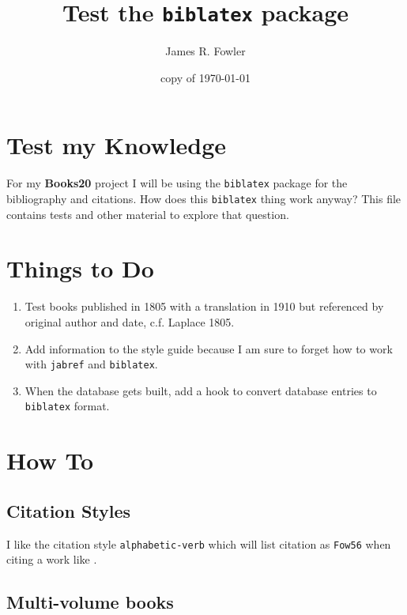 \documentclass{article}
\begin{document}
\title{Test the {\tt biblatex} package}
\author{James R. Fowler}
\date{copy of \today}
\maketitle


\section{Test my Knowledge}

For my {\bf Books20} project I will be using the {\tt biblatex}\cite{Kime2019}
package for the bibliography and citations.
How does this {\tt biblatex} thing work anyway? This
file contains tests and other material to explore that question.


\section{Things to Do}

\begin{enumerate}
  \item Test books published in 1805 with a translation in 1910
    but referenced by original author and date,
    c.f. Laplace 1805. \cite{Laplace1805}

  \item Add information to the style guide because I am sure to forget
    how to work with {\tt jabref} and {\tt biblatex}.

  \item When the database gets built, add a hook to convert database
    entries to {\tt biblatex} format.
\end{enumerate}

\section{How To}

\subsection{Citation Styles}

I like the citation style {\tt alphabetic-verb} which will
list citation as {\tt Fow56} when citing a work like \cite{Fowler1956}.

\subsection{Multi-volume books}
\end{document}

